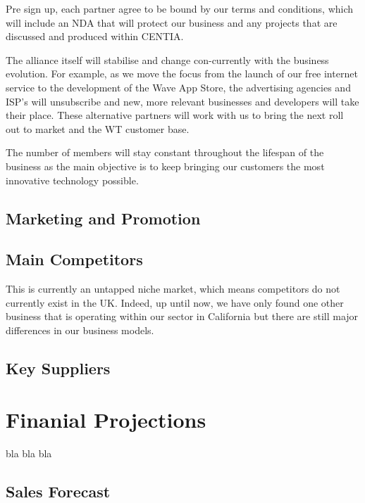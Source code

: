 \documentclass[letterpaper,10pt,openany,oneside,english]{sphinxmanual}
\begin{document}
Pre sign up, each partner agree to be bound by our terms and conditions, which will include an NDA that will protect our business and any projects that are discussed and produced within CENTIA.

The alliance itself will stabilise and change con-currently with the business evolution. For example, as we move the focus from the launch of our free internet service to the development of the Wave App Store, the advertising agencies and ISP’s will unsubscribe and new, more relevant businesses and developers will take their place. These alternative partners will work with us to bring the next roll out to market and the WT customer base.

The number of members will stay constant throughout the lifespan of the business as the main objective is to keep bringing our customers the most innovative technology possible.


\section{Marketing and Promotion}
\label{\detokenize{market-analysis:marketing-and-promotion}}

\section{Main Competitors}
\label{\detokenize{market-analysis:main-competitors}}
This is currently an untapped niche market, which means competitors do not currently exist in the UK. Indeed, up until now, we have only found one other business that is operating within our sector in California but there are still major differences in our business models.


\section{Key Suppliers}
\label{\detokenize{market-analysis:key-suppliers}}

\chapter{Finanial Projections}
\label{\detokenize{financial-projections:finanial-projections}}\label{\detokenize{financial-projections::doc}}
bla bla bla


\section{Sales Forecast}
\label{\detokenize{financial-projections:sales-forecast}}
\end{document}
